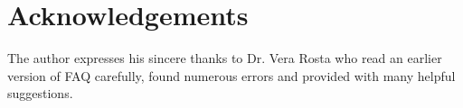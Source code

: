 \documentclass[[a4paper,12pt]{article}
\begin{document}
\section{Acknowledgements}
The author expresses his sincere thanks to Dr. Vera Rosta who
read an earlier version of FAQ carefully, found numerous errors
and provided with many helpful suggestions.


\addtolength{\baselineskip}{-0.3\baselineskip}



\end{document}
